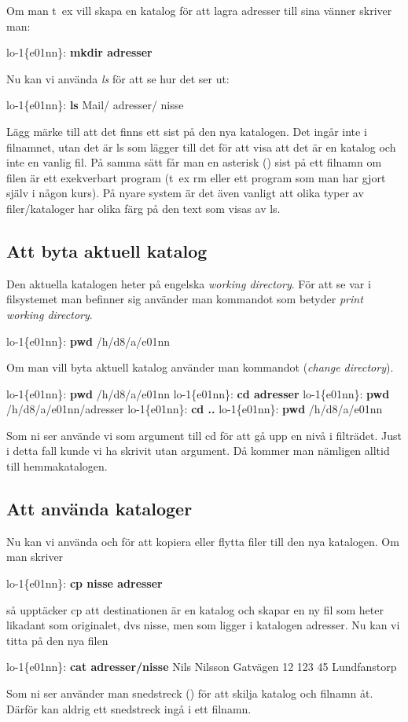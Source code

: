 \documentclass[a4paper,twocolumn]{book}
\begin{document}
Om man t~ex vill skapa en katalog för att lagra adresser till sina
vänner skriver man:
\begin{example}
lo-1\{e01nn\}: \textbf{mkdir adresser}
\end{example}
Nu kan vi använda \emph{ls} för att se hur det ser ut:
\begin{example}
lo-1\{e01nn\}: \textbf{ls}
Mail/      adresser/  nisse
\end{example}
Lägg märke till att det finns ett
\hidettindex{/} sist på den nya katalogen. Det
ingår inte i filnamnet, utan det är ls som lägger till det för att
visa att det är en katalog och inte en vanlig fil. På samma sätt får
man en asterisk (\ttindex{*}) sist på ett filnamn om filen är
ett exekverbart program (t~ex rm eller ett program som man har gjort själv i
någon kurs).
På nyare system är det även vanligt att olika typer av filer/kataloger har olika färg på den text som visas av ls.

\subsection{Att byta aktuell katalog}

Den aktuella katalogen
heter på engelska \emph{working directory}. För att se var i
filsystemet man befinner sig använder man kommandot  som
betyder \emph{print working directory}.
\begin{example}
lo-1\{e01nn\}: \textbf{pwd}
/h/d8/a/e01nn
\end{example}

Om man vill byta aktuell katalog använder man kommandot 
(\emph{change directory}).
\begin{example}
lo-1\{e01nn\}: \textbf{pwd}
/h/d8/a/e01nn
lo-1\{e01nn\}: \textbf{cd adresser}
lo-1\{e01nn\}: \textbf{pwd}
/h/d8/a/e01nn/adresser
lo-1\{e01nn\}: \textbf{cd ..}
lo-1\{e01nn\}: \textbf{pwd}
/h/d8/a/e01nn
\end{example}
Som ni ser använde vi  som argument till cd för att gå upp en
nivå i filträdet. Just i detta fall kunde vi ha skrivit  utan
argument. Då kommer man nämligen alltid till hemmakatalogen.

\subsection{Att använda kataloger}

Nu kan vi använda  och  för att kopiera eller
flytta filer till den nya katalogen. Om man skriver
\begin{example}
lo-1\{e01nn\}: \textbf{cp nisse adresser}
\end{example}
så upptäcker cp att destinationen är en katalog och skapar en ny fil
som heter likadant som originalet, dvs nisse, men som ligger i
katalogen adresser. Nu kan vi titta på den nya filen
\begin{example}
lo-1\{e01nn\}: \textbf{cat adresser/nisse}
Nils Nilsson
Gatvägen 12
123 45 Lundfanstorp
\end{example}
Som ni ser använder man snedstreck (\ST{/}) för att skilja katalog och
filnamn åt. Därför kan aldrig ett snedstreck ingå i ett filnamn.
\end{document}
